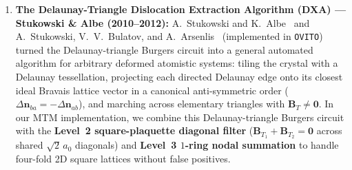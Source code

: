 \documentclass[11pt,a4paper]{article}
\newcommand{\code}[1]{\texttt{#1}}
\begin{document}
\begin{enumerate}
        holds identically.
  \item \textbf{The Delaunay-Triangle Dislocation Extraction Algorithm (DXA) --- Stukowski \& Albe (2010--2012):}
        A.~Stukowski and K.~Albe~\cite{Stukowski2010} and A.~Stukowski, V.~V.~Bulatov, and
        A.~Arsenlis~\cite{Stukowski2012} (implemented in \code{OVITO}) turned the Delaunay-triangle
        Burgers circuit into a general automated algorithm for arbitrary deformed atomistic systems:
        tiling the crystal with a Delaunay tessellation, projecting each directed Delaunay edge onto
        its closest ideal Bravais lattice vector in a canonical anti-symmetric order
        ($\Delta\bm{n}_{ba} = -\Delta\bm{n}_{ab}$), and marching across elementary triangles with
        $\bm{B}_T \neq \bm{0}$. In our MTM implementation, we combine this Delaunay-triangle Burgers
        circuit with the \textbf{Level~2 square-plaquette diagonal filter} ($\bm{B}_{T_1} + \bm{B}_{T_2} = \bm{0}$
        across shared $\sqrt{2}\,a_0$ diagonals) and \textbf{Level~3 $1$-ring nodal summation} to
        handle four-fold 2D square lattices without false positives.
\end{enumerate}
\end{document}
